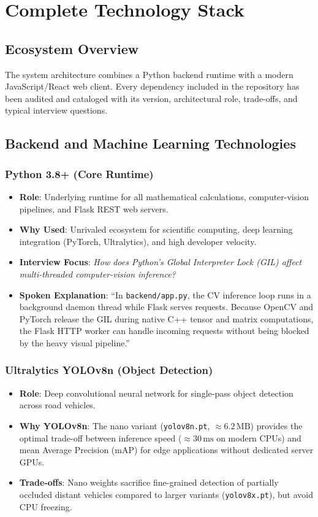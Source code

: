 \chapter{Complete Technology Stack}

\section{Ecosystem Overview}
The system architecture combines a Python backend runtime with a modern JavaScript/React web client. Every dependency included in the repository has been audited and cataloged with its version, architectural role, trade-offs, and typical interview questions.

\section{Backend and Machine Learning Technologies}

\subsection{Python 3.8+ (Core Runtime)}
\begin{itemize}[leftmargin=*]
    \item \textbf{Role}: Underlying runtime for all mathematical calculations, computer-vision pipelines, and Flask REST web servers.
    \item \textbf{Why Used}: Unrivaled ecosystem for scientific computing, deep learning integration (PyTorch, Ultralytics), and high developer velocity.
    \item \textbf{Interview Focus}: \textit{How does Python's Global Interpreter Lock (GIL) affect multi-threaded computer-vision inference?}
    \item \textbf{Spoken Explanation}: ``In \texttt{backend/app.py}, the CV inference loop runs in a background daemon thread while Flask serves requests. Because OpenCV and PyTorch release the GIL during native C++ tensor and matrix computations, the Flask HTTP worker can handle incoming requests without being blocked by the heavy visual pipeline.''
\end{itemize}

\subsection{Ultralytics YOLOv8n (Object Detection)}
\begin{itemize}[leftmargin=*]
    \item \textbf{Role}: Deep convolutional neural network for single-pass object detection across road vehicles.
    \item \textbf{Why YOLOv8n}: The nano variant (\texttt{yolov8n.pt}, $\approx 6.2\,\text{MB}$) provides the optimal trade-off between inference speed ($\approx 30\,\text{ms}$ on modern CPUs) and mean Average Precision (mAP) for edge applications without dedicated server GPUs.
    \item \textbf{Trade-offs}: Nano weights sacrifice fine-grained detection of partially occluded distant vehicles compared to larger variants (\texttt{yolov8x.pt}), but avoid CPU freezing.
\end{itemize}

